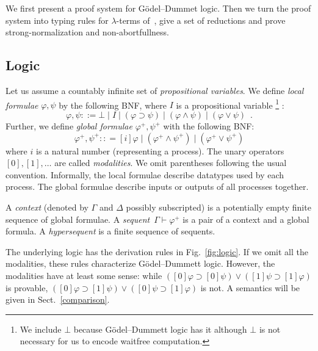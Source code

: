 \section{\lgd}
\label{lgd}

We first present a proof system for G\"odel--Dummet logic.
Then we turn the proof system into typing rules for $\lambda$-terms
of~\lgd, give a set of reductions and prove strong-normalization and
non-abortfullness.

\subsection{Logic}

\newcommand{\m}[1]{{#1}^+}

Let us assume a countably infinite set of \textit{propositional variables}.
We define \textit{local formulae} $\varphi, \psi$ by the following BNF,
where $I$ is a
propositional variable%
\footnote{We include $\bot$ because G\"odel--Dummett logic has it
although $\bot$ is not necessary for us to encode waitfree computation.}%
:
\[
 \varphi,\psi ::= \bot \mid I \mid (\varphi\supset\psi) \mid (\varphi\wedge\psi) \mid
 (\varphi\vee\psi)\enspace.
\]
Further, we define \textit{global formulae} $\m\varphi, \m\psi$ with the following
BNF:
\[
 \m\varphi,\m\psi :: = [i]\varphi \mid
 (\m\varphi\wedge\m\psi)\mid (\m\varphi\vee\m\psi)
\]
where $i$ is a natural number (representing a process).  The unary operators $[0],
[1],\ldots$ are called \textit{modalities}.
We omit parentheses following the usual convention.
Informally, the local formulae describe datatypes used by each process.
The global formulae describe inputs or outputs of all
processes together.

A \textit{context} (denoted by $\Gamma$ and $\Delta$ possibly
subscripted) is a potentially empty
finite sequence of global formulae.
A \textit{sequent}~$\Gamma\vdash\m\varphi$ is a pair of a context and a
global formula.
A \textit{hypersequent} is a finite sequence of sequents.

The underlying logic has the derivation rules in Fig.~\ref{fig:logic}.  If
we omit all the modalities, these rules characterize
G\"odel--Dummett logic.
However, the modalities have at least some sense: while
$([0]\varphi\supset[0]\psi)\vee([1]\psi\supset[1]\varphi)$ is provable,
$([0]\varphi\supset[1]\psi)\vee([0]\psi\supset[1]\varphi)$ is not.
A semantics will be given in Sect.~\ref{comparison}.

